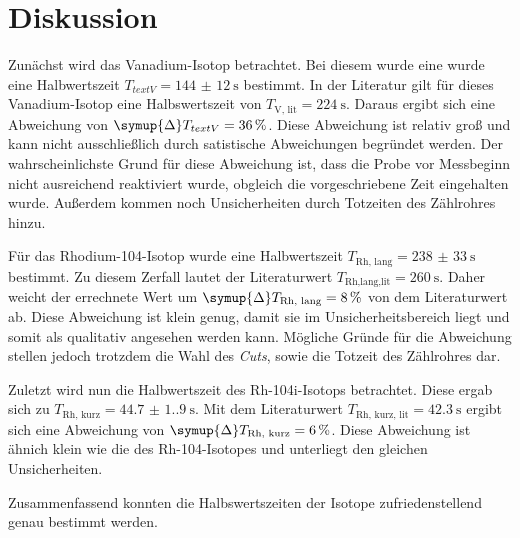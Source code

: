 \section{Diskussion}
\label{sec:Diskussion}
Zunächst wird das Vanadium-Isotop betrachtet. Bei diesem wurde eine wurde eine Halbwertszeit $T_{text{V}} = \qty{144(12)}{\second}$ bestimmt. In der Literatur gilt für dieses 
Vanadium-Isotop eine Halbswertszeit von $T_\text{V, lit} = \qty{224}{\second}$. Daraus ergibt sich eine Abweichung von $\symup{\Delta}T_{text{V}} = \qty{36}{\percent}$.
Diese Abweichung ist relativ groß und kann nicht ausschließlich durch satistische Abweichungen begründet werden. Der wahrscheinlichste Grund für diese Abweichung ist, dass 
die Probe vor Messbeginn nicht ausreichend reaktiviert wurde, obgleich die vorgeschriebene Zeit eingehalten wurde. Außerdem kommen noch Unsicherheiten durch Totzeiten
des Zählrohres hinzu. 

Für das Rhodium-104-Isotop wurde eine Halbwertszeit $T_\text{Rh, lang} = \qty{238(33)}{\second}$ bestimmt. Zu diesem Zerfall lautet der Literaturwert 
$T_\text{Rh,lang,lit} = \qty{260}{\second}$. Daher weicht der errechnete Wert um $\symup{\Delta}T_\text{Rh, lang} = \qty{8}{\percent}$ von dem Literaturwert ab.
Diese Abweichung ist klein genug, damit sie im Unsicherheitsbereich liegt und somit als qualitativ angesehen werden kann. Mögliche Gründe für die Abweichung stellen jedoch 
trotzdem die Wahl des \textit{Cuts}, sowie die Totzeit des Zählrohres dar.

Zuletzt wird nun die Halbwertszeit des Rh-104i-Isotops betrachtet. Diese ergab sich zu $T_\text{Rh, kurz} = \qty{44.7(1.9)}{\second}$. Mit dem Literaturwert 
$T_\text{Rh, kurz, lit} = \qty{42.3}{\second}$ ergibt sich eine Abweichung von $\symup{\Delta}T_\text{Rh, kurz} = \qty{6}{\percent}$. Diese Abweichung ist ähnich klein wie die 
des Rh-104-Isotopes und unterliegt den gleichen Unsicherheiten.

Zusammenfassend konnten die Halbswertszeiten der Isotope zufriedenstellend genau bestimmt werden.